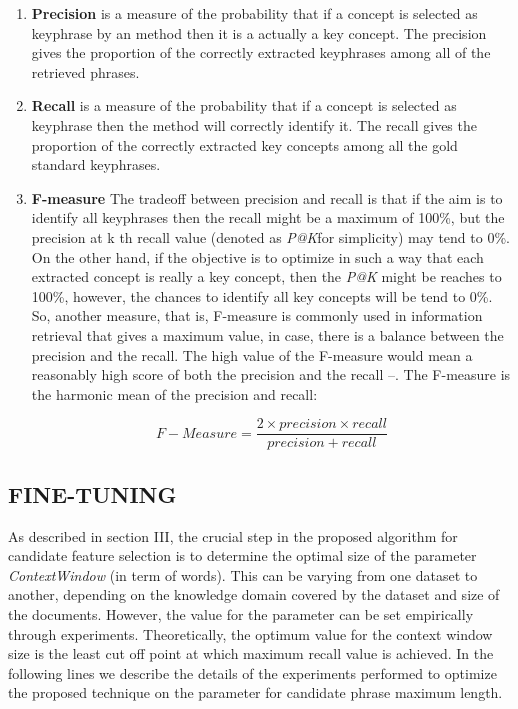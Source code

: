 \documentclass{ieeeaccess}
\begin{document}
\begin{enumerate}
	\item
{\textbf{Precision} is a measure of the probability that if a concept is selected as keyphrase by an method then it is a actually a key concept. The precision gives the proportion of the correctly extracted keyphrases among all of the retrieved phrases.}

	\item
{\textbf{Recall} is a measure of the probability that if a concept is selected as keyphrase then the method will correctly identify it. The recall gives the proportion of the correctly extracted key concepts among all the gold  standard keyphrases.}

	\item
{\textbf{F-measure} The tradeoff between precision and recall is that if the aim is to identify all keyphrases then the recall might be a maximum of 100\%, but the precision at k th recall value (denoted as \textit{P@K}for simplicity) may tend to 0\%. On the other hand, if the objective is to optimize in such a way that each extracted concept is really a key concept,  then the \textit{P@K} might be reaches to 100\%, however, the chances to identify all key concepts will be tend to  0\%. So,  another measure, that is, F-measure is commonly used in information retrieval that gives a maximum value, in case, there  is a balance between the precision and the recall. The high value of the F-measure would mean a reasonably high score of  both the precision and the recall \cite{b33}–\cite{b35}. The F-measure is the harmonic mean of the precision and recall:

\begin{equation*} F-Measure=\frac {2\times precision \times recall}{precision+recall}\tag{1}\end{equation*}
}
\end{enumerate}

\subsection{FINE-TUNING}
As described in section III, the crucial step in the proposed algorithm for candidate feature selection is to determine the optimal size of the parameter \textit{ContextWindow} (in term of words). This can be varying from one dataset to another,    depending on the knowledge domain covered by the dataset and size of the documents. However, the value for the parameter  can be set empirically through experiments. Theoretically, the optimum value for the context window size is the least cut off point at which maximum recall value is achieved. In the following lines we describe the details of the experiments  performed to optimize the proposed technique on the parameter for candidate phrase maximum length.
\end{document}
